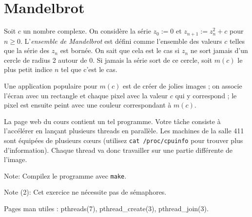 \documentclass[11pt]{article}
\begin{document}
\section{Mandelbrot}

Soit $c$ un nombre complexe. On considère la série
$z_0:=0$ et $z_{n+1}:=z_n^2+c$ pour $n\ge0$. L'\emph{ensemble de Mandelbrot}
est défini comme l'ensemble des valeurs $c$ telles que la série des $z_n$
est bornée. On sait que cela est le cas si $z_n$ ne sort jamais d'un
cercle de radius 2 autour de 0. Si jamais la série sort de ce cercle,
soit $m(c)$ le plus petit indice $n$ tel que c'est le cas.

Une application populaire pour $m(c)$ est de créer
de jolies images ; on associe l'écran avec un rectangle et chaque pixel
avec la valeur $c$ qui y correspond ; le pixel est ensuite peint avec
une couleur correspondant à $m(c)$.

La page web du cours contient un tel programme. Votre tâche consiste
à l'accélérer en lançant plusieurs threads en parallèle.
Les machines de la salle 411 sont équipées de plusieurs c\oe{}urs
(utilisez \texttt{cat /proc/cpuinfo} pour trouver plus d'information).
Chaque thread va donc travailler sur une partie différente de l'image.

Note: Compilez le programme avec \texttt{make}.

Note (2): Cet exercice ne nécessite pas de sémaphores.

Pages man utiles : pthreads(7), pthread\_create(3), pthread\_join(3).
\end{document}
